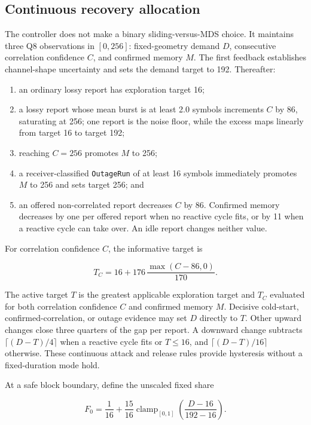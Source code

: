 \documentclass[11pt]{article}
\newcommand{\code}[1]{\ifmmode\text{\texttt{#1}}\else\texttt{#1}\fi}
\newcommand{\field}[1]{\code{#1}}
\begin{document}
\subsection{Continuous recovery allocation}
\label{sec:sliding-fixed-transition}

The controller does not make a binary sliding-versus-MDS choice. It maintains
three Q8 observations in $[0,256]$: fixed-geometry demand $D$, consecutive
correlation confidence $C$, and confirmed memory $M$. The first feedback
establishes channel-shape uncertainty and sets the demand target to 192.
Thereafter:

\begin{enumerate}
\item an ordinary lossy report has exploration target 16;
\item a lossy report whose mean burst is at least 2.0 symbols increments $C$ by
      86, saturating at 256; one report is the noise floor, while the excess maps
      linearly from target 16 to target 192;
\item reaching $C=256$ promotes $M$ to 256;
\item a receiver-classified \field{OutageRun} of at least 16 symbols immediately
      promotes $M$ to 256 and sets target 256; and
\item an offered non-correlated report decreases $C$ by 86. Confirmed memory
      decreases by one per offered report when no reactive cycle fits, or by 11
      when a reactive cycle can take over. An idle report changes neither value.
\end{enumerate}

For correlation confidence $C$, the informative target is

\[
 T_C = 16 + 176\,
       \frac{\max(C-86,0)}{170}.
\]

The active target $T$ is the greatest applicable exploration target and
$T_C$ evaluated for both correlation confidence $C$ and confirmed memory $M$.
Decisive cold-start, confirmed-correlation, or outage
evidence may set $D$ directly to $T$. Other upward changes close three quarters
of the gap per report. A downward change subtracts
$\lceil(D-T)/4\rceil$ when a reactive cycle fits or $T\leq16$, and
$\lceil(D-T)/16\rceil$ otherwise. These continuous attack and release rules
provide hysteresis without a fixed-duration mode hold.

At a safe block boundary, define the unscaled fixed share

\[
 F_0 = \frac{1}{16} + \frac{15}{16}
       \operatorname{clamp}_{[0,1]}\!\left(\frac{D-16}{192-16}\right).
\]
\end{document}

